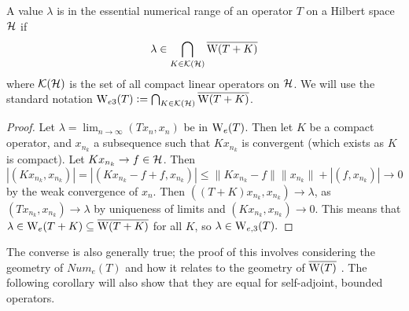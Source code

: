 \documentclass[../main.tex]{subfiles}
\begin{document}
\begin{theorem}
\label{thm:ess-ran-compact-ptb}
  A value $\lambda$ is in the essential numerical range of an operator $T$ on a
  Hilbert space $\mathcal{H}$ if
    $$\lambda \in \bigcap_{K \in \mathcal{K}(\mathcal{H})} \overline{\mathrm{W}(T+K)}$$
  where $\mathcal{K}(\mathcal{H})$ is the set of all compact linear operators on $\mathcal{H}$.
  We will use the standard notation
  $\mathrm{W}_{e3}(T) \mathrel{\mathop:}= \bigcap_{K \in \mathcal{K}(\mathcal{H})} \overline{\mathrm{W}(T+K)}$. 
\end{theorem}
\begin{proof}
Let $\lambda = \lim_{n \rightarrow \infty}(Tx_n, x_n)$ be in $\mathrm{W}_e(T)$. Then
let $K$ be a compact operator, and $x_{n_k}$ a subsequence such that $Kx_{n_k}$
is convergent (which exists as $K$ is compact). Let $Kx_{n_k} \rightarrow f \in \mathcal{H}$. Then
  $$|(Kx_{n_k}, x_{n_k})| = |(Kx_{n_k} - f + f, x_{n_k})| 
    \leq \|Kx_{n_k} - f\|\|x_{n_k}\| + |(f, x_{n_k})| \rightarrow 0$$
by the weak convergence of $x_n$. Then $((T+K)x_{n_k}, x_{n_k}) \rightarrow \lambda$, as
$(Tx_{n_k}, x_{n_k}) \rightarrow \lambda$ by uniqueness of limits and 
$(Kx_{n_k}, x_{n_k}) \rightarrow 0$. This means that
$\lambda \in \mathrm{W}_e(T+K) \subseteq \overline{\mathrm{W}(T+K)}$ for all $K$, so $\lambda \in \mathrm{W}_{e,3}(T).$
\end{proof}
The converse is also generally true; the proof of this involves considering the geometry of
$Num_e(T)$ and how it relates to the geometry of $\overline{\mathrm{W}(T)}$ \cite{bogli2020essential}.
The following corollary will also show that they are equal for self-adjoint, bounded operators.
\end{document}
